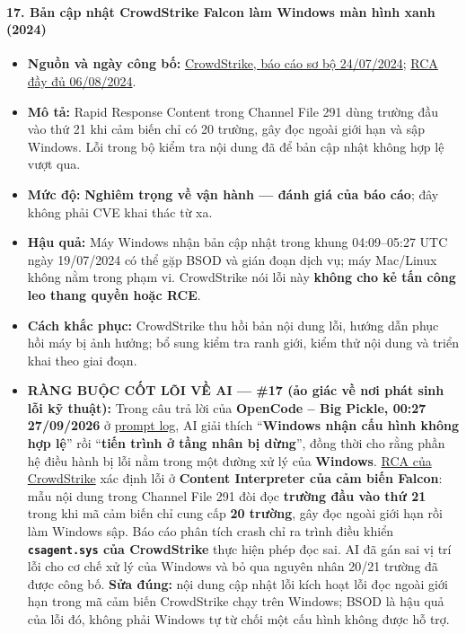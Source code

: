 \paragraph{17. Bản cập nhật CrowdStrike Falcon làm Windows màn hình xanh (2024)}\label{bux1ea3n-cux1eadp-nhux1eadt-crowdstrike-falcon-luxe0m-windows-muxe0n-huxecnh-xanh-2024}

\begin{itemize}
\tightlist
\item
  \textbf{Nguồn và ngày công bố:} \href{https://www.crowdstrike.com/en-us/blog/falcon-content-update-preliminary-post-incident-report/}{CrowdStrike, báo cáo sơ bộ 24/07/2024}; \href{https://www.crowdstrike.com/wp-content/uploads/2024/08/Channel-File-291-Incident-Root-Cause-Analysis-08.06.2024.pdf}{RCA đầy đủ 06/08/2024}.
\item
  \textbf{Mô tả:} Rapid Response Content trong Channel File 291 dùng trường đầu vào thứ 21 khi cảm biến chỉ có 20 trường, gây đọc ngoài giới hạn và sập Windows. Lỗi trong bộ kiểm tra nội dung đã để bản cập nhật không hợp lệ vượt qua.
\item
  \textbf{Mức độ:} \textbf{Nghiêm trọng về vận hành --- đánh giá của báo cáo}; đây không phải CVE khai thác từ xa.
\item
  \textbf{Hậu quả:} Máy Windows nhận bản cập nhật trong khung 04:09--05:27 UTC ngày 19/07/2024 có thể gặp BSOD và gián đoạn dịch vụ; máy Mac/Linux không nằm trong phạm vi. CrowdStrike nói lỗi này \textbf{không cho kẻ tấn công leo thang quyền hoặc RCE}.
\item
  \textbf{Cách khắc phục:} CrowdStrike thu hồi bản nội dung lỗi, hướng dẫn phục hồi máy bị ảnh hưởng; bổ sung kiểm tra ranh giới, kiểm thử nội dung và triển khai theo giai đoạn.
\item
  \textbf{RÀNG BUỘC CỐT LÕI VỀ AI --- \#17 (ảo giác về nơi phát sinh lỗi kỹ thuật):} Trong câu trả lời của \textbf{OpenCode -- Big Pickle, 00:27 27/09/2026} ở \href{Appendix_A_Prompt_Log.md}{prompt log}, AI giải thích ``\textbf{Windows nhận cấu hình không hợp lệ}'' rồi ``\textbf{tiến trình ở tầng nhân bị dừng}'', đồng thời cho rằng phần hệ điều hành bị lỗi nằm trong một đường xử lý của \textbf{Windows}. \href{https://www.crowdstrike.com/wp-content/uploads/2024/08/Channel-File-291-Incident-Root-Cause-Analysis-08.06.2024.pdf}{RCA của CrowdStrike} xác định lỗi ở \textbf{Content Interpreter của cảm biến Falcon}: mẫu nội dung trong Channel File 291 đòi đọc \textbf{trường đầu vào thứ 21} trong khi mã cảm biến chỉ cung cấp \textbf{20 trường}, gây đọc ngoài giới hạn rồi làm Windows sập. Báo cáo phân tích crash chỉ ra trình điều khiển \textbf{\texttt{csagent.sys} của CrowdStrike} thực hiện phép đọc sai. AI đã gán sai vị trí lỗi cho cơ chế xử lý của Windows và bỏ qua nguyên nhân 20/21 trường đã được công bố. \textbf{Sửa đúng:} nội dung cập nhật lỗi kích hoạt lỗi đọc ngoài giới hạn trong mã cảm biến CrowdStrike chạy trên Windows; BSOD là hậu quả của lỗi đó, không phải Windows tự từ chối một cấu hình không được hỗ trợ.
\end{itemize}

